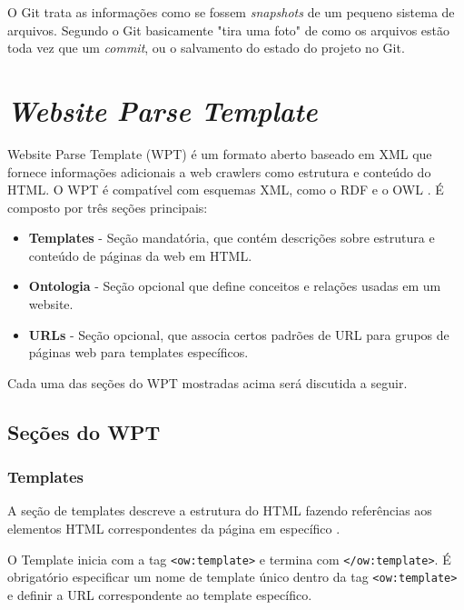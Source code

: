O Git trata as informações como se fossem \emph{snapshots} de um pequeno sistema de arquivos. Segundo \cite[p. 6]{progit} o Git basicamente "tira uma foto" de como os arquivos estão toda vez que um \emph{commit}, ou o salvamento do estado do projeto no Git.

\pagebreak


\section{\emph{Website Parse Template}}


Website Parse Template (WPT) é um formato aberto baseado em XML que fornece informações adicionais a web crawlers como estrutura e conteúdo do HTML. O WPT é compatível com esquemas XML, como o RDF e o OWL \cite{wpt}. É composto por três seções principais:

\begin{itemize}
	\item \textbf{Templates} - Seção mandatória, que contém descrições sobre estrutura e conteúdo de páginas da web em HTML.
	\item \textbf{Ontologia} - Seção opcional que define conceitos e relações usadas em um website.
	\item \textbf{URLs} - Seção opcional, que associa certos padrões de URL para grupos de páginas web para templates específicos. 
\end{itemize}

Cada uma das seções do WPT mostradas acima será discutida a seguir.

\subsection{Seções do WPT}

\subsubsection{Templates}

A seção de templates descreve a estrutura do HTML fazendo referências aos elementos HTML correspondentes da página em específico \cite{wpt}.

O Template inicia com a tag \texttt{<ow:template>} e termina com  \texttt{</ow:template>}. É obrigatório especificar um nome de template único dentro da tag \texttt{<ow:template>} e definir a URL correspondente ao template específico.

